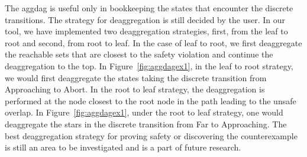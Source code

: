 The aggdag is useful only in bookkeeping the states that encounter the discrete transitions. The strategy for deaggregation is still decided by the user. In our tool, we have implemented two deaggregation strategies, first, from the leaf to root and second, from root to leaf. In the case of leaf to root, we first deaggregate the reachable sets that are closest to the safety violation and continue the deaggregation to the top. In Figure~\ref{fig:aggdagex1}, in the leaf to root strategy, we would first deaggregate the states taking the discrete transition from Approaching to Abort. In the root to leaf strategy, the deaggregation is performed at the node closest to the root node in the path leading to the unsafe overlap. In Figure~\ref{fig:aggdagex1}, under the root to leaf strategy, one would deaggregate the stars in the discrete transition from Far to Approaching. The best deaggregation strategy for proving safety or discovering the counterexample is still an area to be investigated and is a part of future research.






